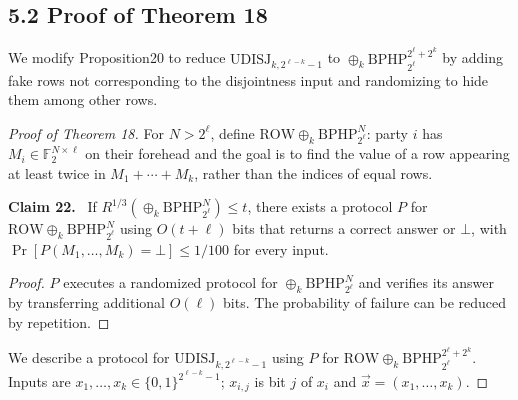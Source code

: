 \documentclass[10pt,a4paper]{article}
\newenvironment{authorclaim}[1]{\par\medskip\noindent\textbf{#1.}\ \ignorespaces}{\par\medskip}
\begin{document}
\subsection*{5.2 Proof of Theorem 18}
We modify Proposition20 to reduce $\mathrm{UDISJ}_{k,2^{\ell-k}-1}$ to $\oplus_k\mathrm{BPHP}_{2^\ell}^{2^\ell+2^k}$ by adding fake rows not corresponding to the disjointness input and randomizing to hide them among other rows.
\begin{proof}[Proof of Theorem 18]
For $N>2^\ell$, define $\mathrm{ROW}\oplus_k\mathrm{BPHP}_{2^\ell}^N$: party $i$ has $M_i\in\mathbb F_2^{N\times\ell}$ on their forehead and the goal is to find the value of a row appearing at least twice in $M_1+\cdots+M_k$, rather than the indices of equal rows.
\begin{authorclaim}{Claim 22}
If $R^{1/3}(\oplus_k\mathrm{BPHP}_{2^\ell}^N)\le t$, there exists a protocol $P$ for $\mathrm{ROW}\oplus_k\mathrm{BPHP}_{2^\ell}^N$ using $O(t+\ell)$ bits that returns a correct answer or $\bot$, with $\Pr[P(M_1,\ldots,M_k)=\bot]\le1/100$ for every input.
\end{authorclaim}
\begin{proof}
$P$ executes a randomized protocol for $\oplus_k\mathrm{BPHP}_{2^\ell}^N$ and verifies its answer by transferring additional $O(\ell)$ bits. The probability of failure can be reduced by repetition.
\end{proof}
We describe a protocol for $\mathrm{UDISJ}_{k,2^{\ell-k}-1}$ using $P$ for $\mathrm{ROW}\oplus_k\mathrm{BPHP}_{2^\ell}^{2^\ell+2^k}$. Inputs are $x_1,\ldots,x_k\in\{0,1\}^{2^{\ell-k}-1}$; $x_{i,j}$ is bit $j$ of $x_i$ and $\vec x=(x_1,\ldots,x_k)$.

\end{proof}
\end{document}
